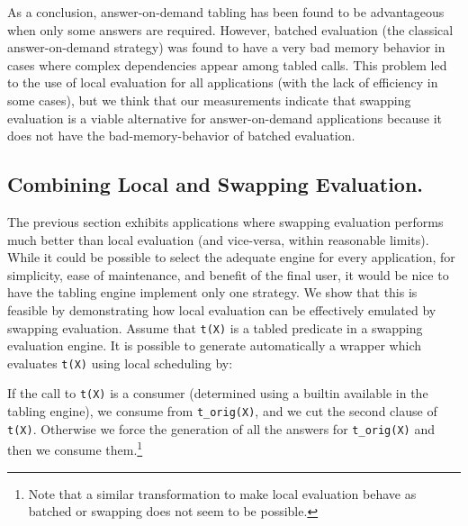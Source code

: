 \documentclass{./tlp}
\newenvironment{pcode}
    {\begin{lstlisting}[language=prolog,morekeywords=call,morekeywords=table]}
    {\end{lstlisting}}
\newcommand{\redsect}{\vspace{-1em}}
\begin{document}
As a conclusion, answer-on-demand tabling has been found to be
advantageous when only some answers are required.  However, batched
evaluation (the classical answer-on-demand strategy) was found to have
a very bad memory behavior in cases where complex dependencies appear
among tabled calls. This problem led to the use of local evaluation
for all applications (with the lack of efficiency in some cases), but
we think that our measurements indicate that swapping evaluation is a
viable alternative for answer-on-demand applications because it does
not have the bad-memory-behavior of batched evaluation.



\redsect
\subsection{Combining Local and Swapping Evaluation.}
\label{sec:simulate-local} 












The previous section exhibits applications where swapping
evaluation performs much better than local evaluation (and vice-versa,
within reasonable limits).  While it could be possible to select the
adequate engine for every application, for simplicity, ease of
maintenance, and benefit of the final user, it would be nice to have
the tabling engine implement only one strategy.
We show that this is feasible by demonstrating how local evaluation can be
effectively emulated by swapping evaluation.  Assume that
\lstinline{t(X)} is a tabled predicate in a swapping evaluation
engine.  It is possible to generate automatically a wrapper which
evaluates \lstinline{t(X)} using local scheduling by:



If the call to \lstinline{t(X)} is a consumer (determined using a
builtin available in the tabling engine), we consume from
\lstinline{t_orig(X)}, and we cut the second clause of
\lstinline{t(X)}.  Otherwise we force the generation of all the
answers for \lstinline{t_orig(X)} and then we consume
them.\footnote{Note that a similar transformation to make local
  evaluation behave as  batched or swapping
does not seem to be possible.}
\end{document}
